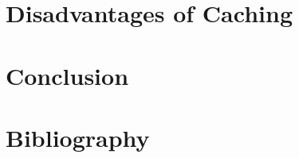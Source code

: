 \documentclass[a4paper,12pt]{article}
\begin{document}
\section{Disadvantages of Caching}


\section{Conclusion}

\newpage
\renewcommand\refname{\vskip -1cm}
\section{Bibliography}

\nocite{hwu:procon}
\nocite{MPEGDASH}
\nocite{citrix:caching}
\nocite{OnlineVideoBandwagon}
\nocite{ats:caching}
\nocite{expandedramblings:stats}
\nocite{techopedia:weighing}


\end{document}
